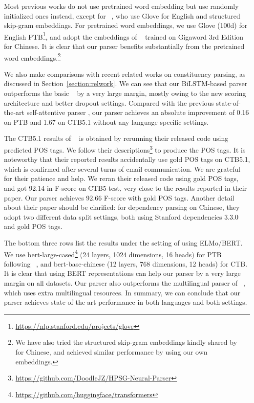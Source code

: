 \documentclass{article}
\begin{document}
\begin{table}[tb]
\begin{table}[tb]
Most previous works do not use pretrained word embedding but use randomly initialized ones instead, except for \citeauthor{zhou-zhao-2019-head}~, who use Glove for English and structured skip-gram embeddings.
For pretrained word embeddings, we use Glove (100d) for English PTB\footnote{\url{https://nlp.stanford.edu/projects/glove}},
and adopt the embeddings of \citeauthor{li-etal-2019-attentive}~ trained on Gigaword 3rd Edition for Chinese.
It is clear that our parser benefits substantially from the pretrained word embeddings.\footnote{
We have also tried the structured skip-gram embeddings kindly shared by \citeauthor{zhou-zhao-2019-head}~ for Chinese, and achieved similar performance by using our own embeddings.
}

We also make comparisons with recent related works on constituency parsing, as discussed in Section~\ref{section:relwork}.
We can see that our BiLSTM-based parser outperforms the basic \citeauthor{stern-etal-2017-minimal}~ by a very large margin, mostly owing to the new scoring architecture and better dropout settings.
Compared with the previous state-of-the-art self-attentive parser \cite{kitaev-klein-2018-constituency},
our parser achieves an absolute improvement of 0.16 on PTB and 1.67 on CTB5.1 without any language-specific settings.





The CTB5.1 results of \citeauthor{zhou-zhao-2019-head}~ is obtained by rerunning their released code using predicted POS tags.
We follow their descriptions\footnote{\url{https://github.com/DoodleJZ/HPSG-Neural-Parser}} to produce the POS tags.
It is noteworthy that their reported results accidentally use gold POS tags on CTB5.1, which is confirmed after several turns of email communication. We are grateful for their patience and help.
We reran their released code using gold POS tags, and got 92.14 in F-score on CTB5-test, very close to the results reported in their paper.
Our parser achieves 92.66 F-score with gold POS tags.
Another detail about their paper should be clarified: for dependency parsing on Chinese, they adopt two different data split settings, both using Stanford dependencies 3.3.0 and gold POS tags.

The bottom three rows list the results under the setting of using ELMo/BERT.
We use bert-large-cased\footnote{\url{https://github.com/huggingface/transformers}} (24 layers, 1024 dimensions, 16 heads) for PTB following \citeauthor{kitaev-etal-2019-multilingual}~, and bert-base-chinese (12 layers, 768 dimensions, 12 heads) for CTB.
It is clear that using BERT representations can help our parser by a very large margin on all datasets. Our parser also outperforms the multilingual parser of \citeauthor{kitaev-etal-2019-multilingual}~, which uses extra multilingual resources.
In summary, we can conclude that our parser achieves state-of-the-art performance in both languages and both settings.


\end{table}
\end{table}
\end{document}

